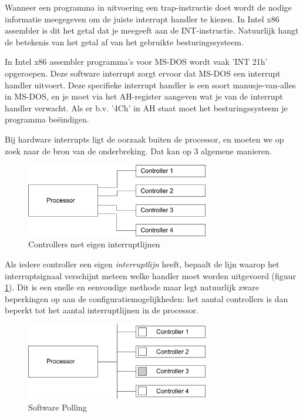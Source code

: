 Wanneer een programma in uitvoering een trap-instructie doet
wordt de nodige informatie meegegeven om de juiste interrupt handler
te kiezen. In Intel x86 assembler is dit het getal dat je meegeeft aan de
INT-instructie. Natuurlijk hangt de betekenis van het getal af van het
gebruikte besturingssysteem.

In Intel x86 assembler programma's voor MS-DOS wordt vaak 'INT 21h'
opgeroepen. Deze software interrupt zorgt ervoor dat MS-DOS een
interrupt handler uitvoert. Deze specifieke interrupt handler is een
soort manusje-van-alles in MS-DOS, en je moet via het AH-register
aangeven wat je van de interrupt handler verwacht. Als er b.v. '4Ch'
in AH staat moet het besturingssysteem je programma be\"eindigen.

Bij hardware interrupts ligt de oorzaak buiten de processor, en
moeten we op zoek naar de bron van de onderbreking. Dat kan op 3
algemene manieren.

\begin{figure}
\begin{center}
\includegraphics[width=80mm]{images/fig0203.png}
\end{center}
\caption{Controllers met eigen interruptlijnen}
\label{eigenlijn}
\end{figure}

Als iedere controller een eigen
\emph{interruptlijn} heeft, bepaalt de lijn waarop het
interruptsignaal verschijnt meteen welke handler moet worden
uitgevoerd (figuur \ref{eigenlijn}). Dit is een snelle en eenvoudige methode
maar legt
natuurlijk zware beperkingen op aan de configuratiemogelijkheden: het
aantal controllers is dan beperkt tot het aantal interruptlijnen in de
processor.

\begin{figure}
\begin{center}
\includegraphics[width=80mm]{images/fig0204.png}
\end{center}
\caption{Software Polling}
\label{eenlijn}
\end{figure}

